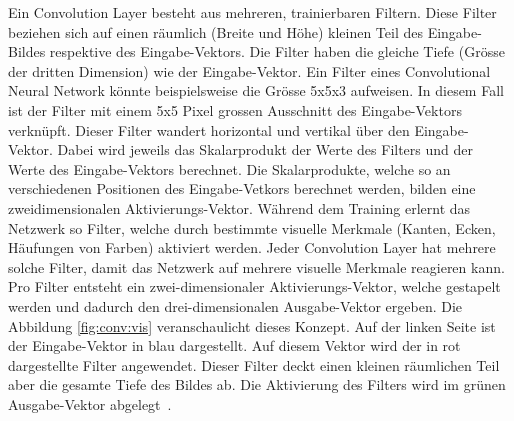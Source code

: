 Ein Convolution Layer besteht aus mehreren, trainierbaren Filtern. Diese Filter beziehen sich auf einen räumlich (Breite und Höhe) kleinen Teil des Eingabe-Bildes respektive des Eingabe-Vektors. Die Filter haben die gleiche Tiefe (Grösse der dritten Dimension) wie der Eingabe-Vektor. Ein Filter eines Convolutional Neural Network könnte beispielsweise die Grösse 5x5x3 aufweisen. In diesem Fall ist der Filter mit einem 5x5 Pixel grossen Ausschnitt des Eingabe-Vektors verknüpft. Dieser Filter wandert horizontal und vertikal über den Eingabe-Vektor. Dabei wird jeweils das Skalarprodukt der Werte des Filters und der Werte des Eingabe-Vektors berechnet. Die Skalarprodukte, welche so an verschiedenen Positionen des Eingabe-Vetkors berechnet werden, bilden eine zweidimensionalen Aktivierungs-Vektor. Während dem Training erlernt das Netzwerk so Filter, welche durch bestimmte visuelle Merkmale (Kanten, Ecken, Häufungen von Farben) aktiviert werden. Jeder Convolution Layer hat mehrere solche Filter, damit das Netzwerk auf mehrere visuelle Merkmale reagieren kann. Pro Filter entsteht ein zwei-dimensionaler Aktivierungs-Vektor, welche gestapelt werden und dadurch den drei-dimensionalen Ausgabe-Vektor ergeben. Die Abbildung \ref{fig:conv:vis} veranschaulicht dieses Konzept. Auf der linken Seite ist der Eingabe-Vektor in blau dargestellt. Auf diesem Vektor wird der in rot dargestellte Filter angewendet. Dieser Filter deckt einen kleinen räumlichen Teil aber die gesamte Tiefe des Bildes ab. Die Aktivierung des Filters wird im grünen Ausgabe-Vektor abgelegt~\autocite{CNN}.


